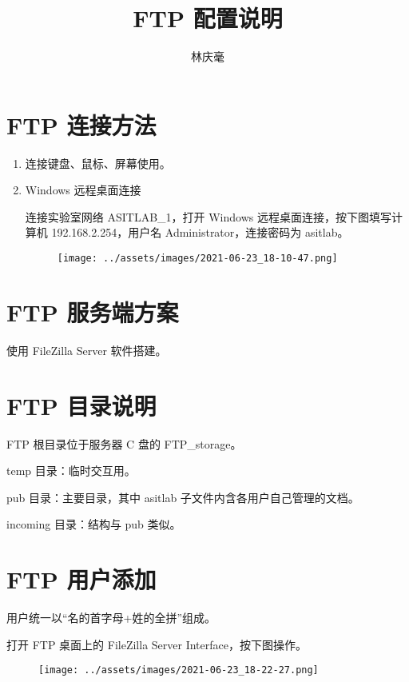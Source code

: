 \documentclass{article}
\begin{document}
\author{林庆毫}
\title{FTP 配置说明}
\maketitle
\tableofcontents
\newpage
{}

\section{FTP 连接方法}
\begin{enumerate}
	\item 连接键盘、鼠标、屏幕使用。

	\item Windows 远程桌面连接

	      连接实验室网络 ASITLAB\_1，打开 Windows 远程桌面连接，按下图填写计算机 192.168.2.254，用户名 Administrator，连接密码为 asitlab。
	      \begin{figure}[!h]
		      \centering
		      \texttt{[image: ../assets/images/2021-06-23\_18-10-47.png]}
	      \end{figure}
\end{enumerate}

\section{FTP 服务端方案}
使用 FileZilla Server 软件搭建。

\section{FTP 目录说明}
FTP 根目录位于服务器 C 盘的 FTP\_storage。

temp 目录：临时交互用。

pub 目录：主要目录，其中 asitlab 子文件内含各用户自己管理的文档。

incoming 目录：结构与 pub 类似。

\section{FTP 用户添加}
用户统一以“名的首字母+姓的全拼”组成。

打开 FTP 桌面上的 FileZilla Server Interface，按下图操作。
\begin{figure}[!h]
	\centering
	\texttt{[image: ../assets/images/2021-06-23\_18-22-27.png]}
\end{figure}
\end{document}
